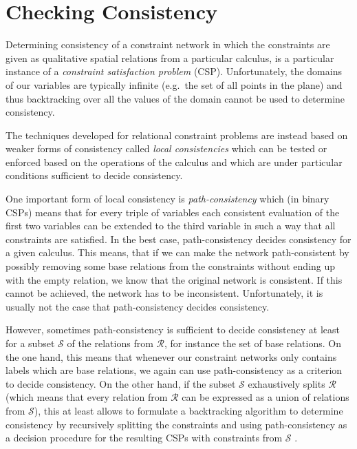 \documentclass[headsepline]{scrreprt}
\theoremstyle{definition}
\begin{document}
\section{Checking Consistency}
\label{sec:consistency}

Determining consistency of a constraint network in which
the constraints are given as qualitative spatial relations
from a particular calculus, is a particular instance
of a \emph{constraint satisfaction problem} (CSP).
Unfortunately, the domains of our variables are typically
infinite (e.g.\ the set of all points in the plane) and
thus backtracking over all the values of the domain cannot
be used to determine consistency.

The techniques developed for relational constraint problems
are instead based on weaker forms of consistency called
\emph{local consistencies} which can be tested or enforced
based on the operations of the calculus and which are
under particular conditions sufficient to decide
consistency.

One important form of local consistency is \emph{path-consistency} which (in binary CSPs) means that for every triple of variables each consistent evaluation of the first two variables can be extended to the third variable in such a way that all constraints are satisfied. In the best case,
path-consistency decides consistency for a given calculus. This means, that
if we can make the network path-consistent by possibly removing some
base relations from the constraints without ending up with the empty relation,
we know that the original network is consistent. If this cannot be achieved,
the network has to be inconsistent. Unfortunately, it is usually not the case
that path-consistency decides consistency.

However, sometimes path-consistency is sufficient to decide consistency
at least for a subset $\mathcal{S}$ of the relations from $\mathcal{R}$,
for instance
the set of base relations. On the one hand, this means that whenever
our constraint networks only contains labels which are base relations,
we again can use path-consistency as a criterion to decide consistency.
On the other hand, if the subset $\mathcal{S}$ exhaustively splits
$\mathcal{R}$ (which means that every relation from $\mathcal{R}$ can be
expressed as a union of relations from $\mathcal{S}$), this at least
allows to formulate a backtracking algorithm to determine consistency
by recursively splitting the constraints and using path-consistency
as a decision procedure for the resulting CSPs with constraints from
$\mathcal{S}$ \citep{ladkin92_qualCSP}.
\end{document}
